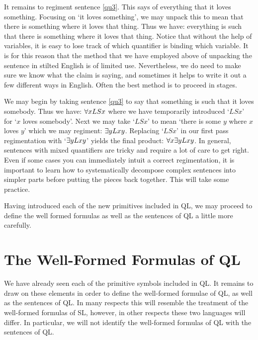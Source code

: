 It remains to regiment sentence \ref{qu3}.
This says of everything that it loves something.
Focusing on `it loves something', we may unpack this to mean that there is something where it loves that thing.
Thus we have: everything is such that there is something where it loves that thing.
Notice that without the help of variables, it is easy to lose track of which quantifier is binding which variable.
It is for this reason that the method that we have employed above of unpacking the sentence in stilted English is of limited use.
Nevertheless, we do need to make sure we know what the claim is saying, and sometimes it helps to write it out a few different ways in English.
Often the best method is to proceed in stages.

We may begin by taking sentence \ref{qu3} to say that something is such that it loves somebody.
Thus we have: $\forall x LS x$ where we have temporarily introduced `$LSx$' for `$x$ loves somebody'.
Next we may take `$LS x$' to mean `there is some $y$ where $x$ loves $y$' which we may regiment: $\exists y Lxy$.
Replacing `$LS x$' in our first pass regimentation with `$\exists y Lxy$' yields the final product: $\forall x \exists y Lxy$.
In general, sentences with mixed quantifiers are tricky and require a lot of care to get right.
Even if some cases you can immediately intuit a correct regimentation, it is important to learn how to systematically decompose complex sentences into simpler parts before putting the pieces back together.
This will take some practice.

Having introduced each of the new primitives included in QL, we may proceed to define the well formed formulas as well as the sentences of QL a little more carefully.





\section{The Well-Formed Formulas of QL}

We have already seen each of the primitive symbols included in QL.
It remains to draw on these elements in order to define the well-formed formulae of QL, as well as the sentences of QL.
In many respects this will resemble the treatment of the well-formed formulas of SL, however, in other respects these two languages will differ.
In particular, we will not identify the well-formed formulas of QL with the sentences of QL.

